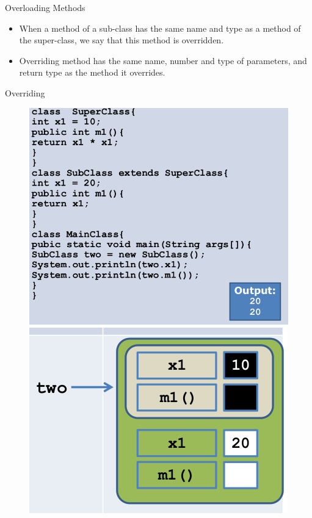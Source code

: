 \documentclass[14pt]{beamer}
\begin{document}
\begin{frame}[fragile]{Overloading Methods}
\begin{itemize}
\item When a method of a sub-class has the same name and type as a method of the super-class, we say that this method is overridden.
\item Overriding method has the same name, number and type of parameters, and return type as the method it overrides.
\end{itemize}
\end{frame}

\begin{frame}[fragile]{Overriding}
 
 
 \begin{figure}[H]
\begin{minipage}[l]{0.5\linewidth}
\includegraphics[scale=.2]{polyoverride7.png}

\end{minipage}
\quad
\begin{minipage}[c]{0.3\textwidth}
\includegraphics[scale=.2]{polyoverride8.png}

\end{minipage}
\end{figure}
\end{frame}
\end{document}

